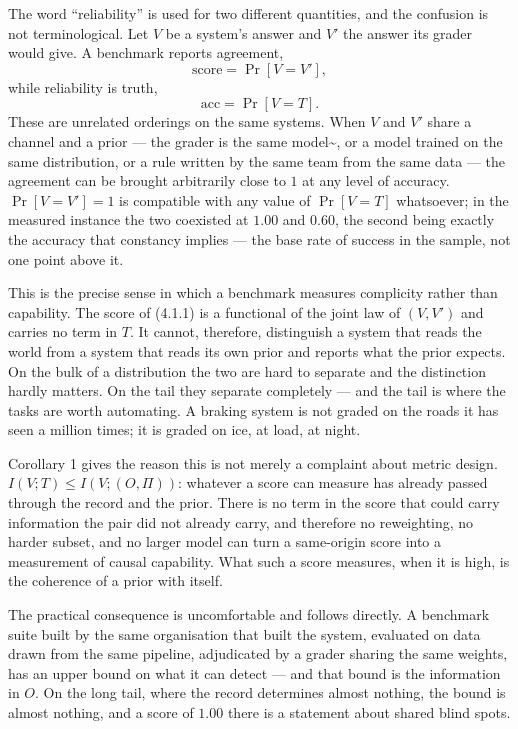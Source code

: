 \documentclass[11pt,a4paper]{article}
\begin{document}
The word ``reliability'' is used for two different quantities, and the confusion is
not terminological. Let \(V\) be a system's answer and \(V'\) the answer its grader
would give. A benchmark reports agreement,
\begin{equation}
\mathrm{score}=\Pr[V=V'],
\tag{4.1.1}
\end{equation}
while reliability is truth,
\begin{equation}
\mathrm{acc}=\Pr[V=T].
\tag{4.1.2}
\end{equation}
These are unrelated orderings on the same systems. When \(V\) and \(V'\) share a
channel and a prior --- the grader is the same model\textasciitilde{}\cite{zheng2023judging}, or a
model trained on the same distribution, or a rule written by the same team from
the same data --- the agreement can be brought arbitrarily close to \(1\) at any
level of accuracy.
\(\Pr[V=V']=1\) is compatible with any value of \(\Pr[V=T]\) whatsoever; in the
measured instance the two coexisted at \(1.00\) and \(0.60\), the second being exactly
the accuracy that constancy implies --- the base rate of success in the sample, not
one point above it.

This is the precise sense in which a benchmark measures complicity rather than
capability. The score of (4.1.1) is a functional of the joint law of \((V,V')\) and
carries no term in \(T\). It cannot, therefore, distinguish a system that reads the
world from a system that reads its own prior and reports what the prior expects.
On the bulk of a distribution the two are hard to separate and the distinction
hardly matters. On the tail they separate completely --- and the tail is where the
tasks are worth automating. A braking system is not graded on the roads it has
seen a million times; it is graded on ice, at load, at night.

Corollary 1 gives the reason this is not merely a complaint about metric design.
\(I(V;T)\le I(V;(O,\Pi))\): whatever a score can measure has already passed through
the record and the prior. There is no term in the score that could carry
information the pair did not already carry, and therefore no reweighting, no
harder subset, and no larger model can turn a same-origin score into a measurement
of causal capability. What such a score measures, when it is high, is the
coherence of a prior with itself.

The practical consequence is uncomfortable and follows directly. A benchmark
suite built by the same organisation that built the system, evaluated on data
drawn from the same pipeline, adjudicated by a grader sharing the same weights,
has an upper bound on what it can detect --- and that bound is the information in
\(O\). On the long tail, where the record determines almost nothing, the bound is
almost nothing, and a score of \(1.00\) there is a statement about shared blind
spots.
\end{document}
